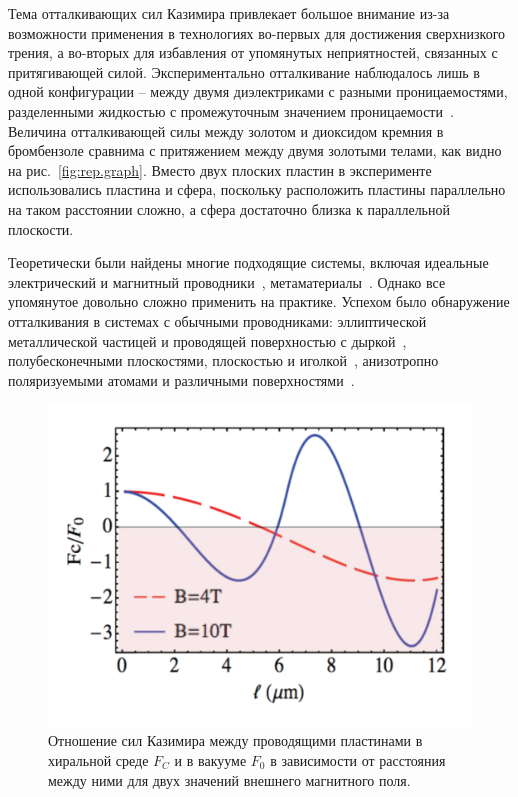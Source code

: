 \documentclass[a4paper, 12pt]{article}
\begin{document}
Тема отталкивающих сил Казимира привлекает большое внимание из-за возможности применения в технологиях во-первых для достижения сверхнизкого трения, а во-вторых для избавления от упомянутых неприятностей, связанных с притягивающей силой. 
Экспериментально отталкивание наблюдалось лишь в одной конфигурации -- между двумя диэлектриками с разными проницаемостями, разделенными жидкостью с промежуточным значением проницаемости~\cite{Repulsion.firstexp}. Величина отталкивающей силы между золотом и диоксидом кремния в бромбензоле сравнима с притяжением между двумя золотыми телами, как видно на рис.~\ref{fig:rep.graph}. Вместо двух плоских пластин в эксперименте использовались пластина и сфера, поскольку расположить пластины параллельно на таком расстоянии сложно, а сфера достаточно близка к параллельной плоскости. 

Теоретически были найдены многие подходящие системы, включая идеальные электрический и магнитный проводники~\cite{Repulsion.magnetic}, метаматериалы~\cite{Repulsion.metamaterial}. 
Однако все упомянутое довольно сложно применить на практике. 
Успехом было обнаружение отталкивания в системах с обычными проводниками: эллиптической металлической частицей и проводящей поверхностью с дыркой~\cite{Repulsion.aperture}, полубесконечными плоскостями, плоскостью и иголкой~\cite{Repulsion.plates.needle}, анизотропно поляризуемыми атомами и различными поверхностями~\cite{Repulsion.conductors}. 

\begin{figure}[b!]
\includegraphics[width=.5\linewidth]{figs/Chiral-Casimir-new}
\caption{Отношение сил Казимира между проводящими пластинами в хиральной среде $F_C$ и в вакууме $F_0$ в зависимости от расстояния между ними для двух значений внешнего магнитного поля.}
\label{fig:Chiral.Casimir}
\end{figure}
\end{document}
